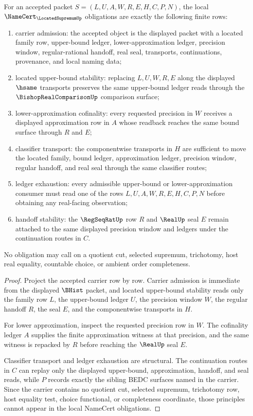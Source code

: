 \begin{theorem}
\label{thm:located-supremum-namecert-obligations}
For an accepted packet $S=(L,U,A,W,R,E,H,C,P,N)$, the local $\NameCert_{\LocatedSupremumUp}$ obligations are exactly the following finite rows:
\begin{enumerate}
\item carrier admission: the accepted object is the displayed packet with a located family row, upper-bound ledger, lower-approximation ledger, precision window, regular-rational handoff, real seal, transports, continuations, provenance, and local naming data;
\item located upper-bound stability: replacing $L,U,W,R,E$ along the displayed $\hsame$ transports preserves the same upper-bound ledger reads through the $\BishopRealComparisonUp$ comparison surface;
\item lower-approximation cofinality: every requested precision in $W$ receives a displayed approximation row in $A$ whose readback reaches the same bound surface through $R$ and $E$;
\item classifier transport: the componentwise transports in $H$ are sufficient to move the located family, bound ledger, approximation ledger, precision window, regular handoff, and real seal through the same classifier routes;
\item ledger exhaustion: every admissible upper-bound or lower-approximation consumer must read one of the rows $L,U,A,W,R,E,H,C,P,N$ before obtaining any real-facing observation;
\item handoff stability: the $\RegSeqRatUp$ row $R$ and $\RealUp$ seal $E$ remain attached to the same displayed precision window and ledgers under the continuation routes in $C$.
\end{enumerate}
No obligation may call on a quotient cut, selected supremum, trichotomy, host real equality, countable choice, or ambient order completeness.
\end{theorem}
\begin{proof}
Project the accepted carrier row by row. Carrier admission is immediate from the displayed $\BHist$ packet, and located upper-bound stability reads only the family row $L$, the upper-bound ledger $U$, the precision window $W$, the regular handoff $R$, the seal $E$, and the componentwise transports in $H$.

For lower approximation, inspect the requested precision row in $W$. The cofinality ledger $A$ supplies the finite approximation witness at that precision, and the same witness is repacked by $R$ before reaching the $\RealUp$ seal $E$.

Classifier transport and ledger exhaustion are structural. The continuation routes in $C$ can replay only the displayed upper-bound, approximation, handoff, and seal reads, while $P$ records exactly the sibling BEDC surfaces named in the carrier. Since the carrier contains no quotient cut, selected supremum, trichotomy row, host equality test, choice functional, or completeness coordinate, those principles cannot appear in the local NameCert obligations.
\end{proof}
